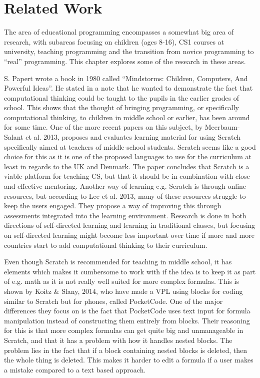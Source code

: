 \chapter{Related Work}
\label{chap:related_work}
The area of educational programming encompasses a somewhat big area of research, with subareas focusing on children (ages 8-16), CS1 courses at university, teaching programming and the transition from novice programming to ``real'' programming. This chapter explores some of the research in these areas.

S. Papert wrote a book in 1980 called ``Mindstorms: Children, Computers, And Powerful Ideas''\cite{s_papert}. He stated in a note that he wanted to demonstrate the fact that computational thinking could be taught to the pupils in the earlier grades of school\cite{turtle_origin}. This shows that the thought of bringing programming, or specifically computational thinking, to children in middle school or earlier, has been around for some time. One of the more recent papers on this subject, by Meerbaum-Salant et al. 2013\cite{learning_computer_scratch}, proposes and evaluates learning material for using Scratch specifically aimed at teachers of middle-school students. Scratch seems like a good choice for this as it is one of the proposed languages to use for the curriculum at least in regards to the UK and Denmark\cite{uk_scratch}\cite{dk_scratch}. The paper concludes that Scratch is a viable platform for teaching CS, but that it should be in combination with close and effective mentoring. Another way of learning e.g. Scratch is through online resources, but according to Lee et al. 2013\cite{ingame_assessment}, many of these resources struggle to keep the users engaged. They propose a way of improving this through assessments integrated into the learning environment. Research is done in both directions of self-directed learning and learning in traditional classes, but focusing on self-directed learning might become less important over time if more and more countries start to add computational thinking to their curriculum.

Even though Scratch is recommended for teaching in middle school, it has elements which makes it cumbersome to work with if the idea is to keep it as part of e.g. math\cite{dk_scratch} as it is not really well suited for more complex formulas. This is shown by Koitz \& Slany, 2014\cite{KoitzSlany14}, who have made a VPL using blocks for coding similar to Scratch but for phones, called PocketCode. One of the major differences they focus on is the fact that PocketCode uses text input for formula manipulation instead of constructing them entirely from blocks. Their reasoning for this is that more complex formulas can get quite big and unmanageable in Scratch, and that it has a problem with how it handles nested blocks. The problem lies in the fact that if a block containing nested blocks is deleted, then the whole thing is deleted. This makes it harder to edit a formula if a user makes a mistake compared to a text based approach.

